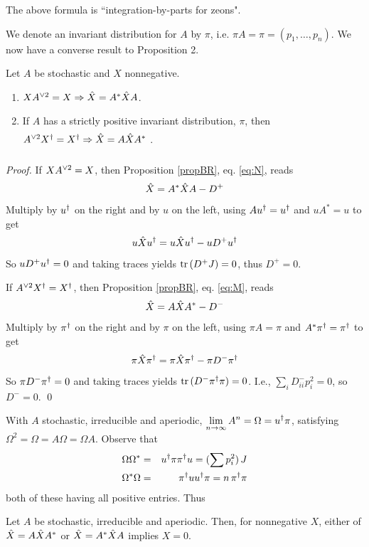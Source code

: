 The above formula is ``integration-by-parts for zeons".

We denote an invariant distribution for $A$ by $\pi$, i.e. $\pi A=\pi=(p_1,\ldots,p_n)$.
We now have a converse result to Proposition 2. 

\begin{proposition}\label{propST}  	\label{prop:7.4}  %
Let  $A$ be stochastic and $X$ nonnegative.
\begin{enumerate}
\item[{\normalfont 1.}] $X{A}^{\vee 2} = X \Rightarrow  \hat X = {A}^*{\hat X}{A}$.

\item[{\normalfont 2.}] If $A$ has a strictly positive invariant distribution, $\pi$, then \\
$\spow{A}{2}\dg  X. = \dg  X.   \Rightarrow  \hat X = \sym{A}{\hat X}\vstrut$.
\end{enumerate}
\end{proposition}

\begin{proof} If $X{A}^{\vee 2} = X$, then Proposition \ref{propBR}, eq. \eqref{eq:N}, reads
$$
  \hat X = {A}^*{\hat X}{A}-D^+
$$
Multiply by $\dg  u.$ on the right and by $u$ on the left, using  $A\dg  u.=\dg  u.$ and $uA^*=u$ to get
$$ 
  u\hat X\dg  u. =u\hat X\dg  u.-uD^+\dg  u.
$$
So $uD^+\dg  u.=0$ and taking traces yields ${\rm tr}\,(D^+J)=0$, thus $D^+=0$.

If $\spow{A}{2}\dg  X. = \dg  X. $, then Proposition \ref{propBR}, eq. \eqref{eq:M}, reads
$$
  \hat  X = {A}{\hat X}{A}^*-D^-
$$
Multiply by $\dg  \pi.$ on the right and by $\pi$ on the left, using $\pi A=\pi$ and $A^*\dg \pi.=\dg \pi.$ to get
$$
  \pi\hat X\dg  \pi. =\pi\hat X\dg  \pi.-\pi D^-\dg  \pi.
$$
So $\pi D^-\dg  \pi.=0$ and taking traces yields $\tr(D^-\dg  \pi.\pi)=0$. I.e., $\displaystyle \sum_i D^-_{ii}p_i^2=0$, so
$D^-=0$. \qed
\end{proof}

With $A$ stochastic, irreducible and aperiodic, $\displaystyle \lim_{n\to\infty}A^n = \Omega=\dg  u.\pi$, satisfying
$\Omega^2=\Omega=A\Omega=\Omega A$. Observe that
%
\begin{eqnarray*}
  \Omega\Omega^* &=& \dg  u.\pi\dg  \pi.u =(\sum p_i^2)\, J\\
  \Omega^*\Omega &=& \dg  \pi.u\dg  u.\pi = n\,\dg  \pi.\pi
\end{eqnarray*}
%
both of these having all positive entries.  Thus

\begin{proposition}\label{propIRPER} 	\label{prop:7.5}  %
Let $A$ be stochastic, irreducible and aperiodic. Then, for nonnegative $X$, either of 
$\hat X={A}{\hat X}{A}^*$ or $\hat X={A}^*{\hat X}{A}$ implies $X=0$.
\end{proposition}

